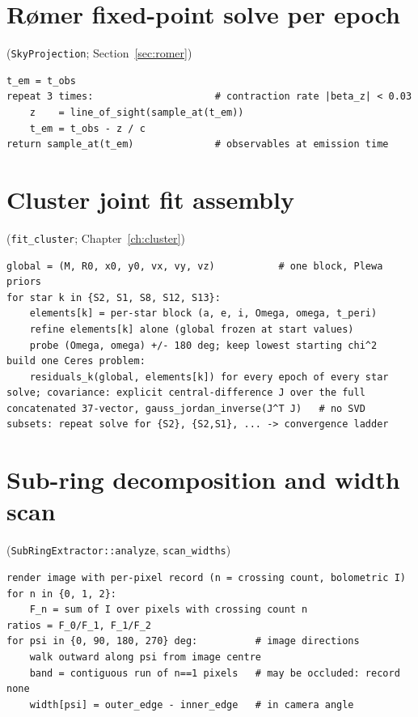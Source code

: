 \section{R{\o}mer fixed-point solve per epoch}
(\texttt{SkyProjection}; Section~\ref{sec:romer})

\begin{verbatim}
t_em = t_obs
repeat 3 times:                     # contraction rate |beta_z| < 0.03
    z    = line_of_sight(sample_at(t_em))
    t_em = t_obs - z / c
return sample_at(t_em)              # observables at emission time
\end{verbatim}

\section{Cluster joint fit assembly}
(\texttt{fit\_cluster}; Chapter~\ref{ch:cluster})

\begin{verbatim}
global = (M, R0, x0, y0, vx, vy, vz)           # one block, Plewa priors
for star k in {S2, S1, S8, S12, S13}:
    elements[k] = per-star block (a, e, i, Omega, omega, t_peri)
    refine elements[k] alone (global frozen at start values)
    probe (Omega, omega) +/- 180 deg; keep lowest starting chi^2
build one Ceres problem:
    residuals_k(global, elements[k]) for every epoch of every star
solve; covariance: explicit central-difference J over the full
concatenated 37-vector, gauss_jordan_inverse(J^T J)   # no SVD
subsets: repeat solve for {S2}, {S2,S1}, ... -> convergence ladder
\end{verbatim}

\section{Sub-ring decomposition and width scan}
(\texttt{SubRingExtractor::analyze}, \texttt{scan\_widths})

\begin{verbatim}
render image with per-pixel record (n = crossing count, bolometric I)
for n in {0, 1, 2}:
    F_n = sum of I over pixels with crossing count n
ratios = F_0/F_1, F_1/F_2
for psi in {0, 90, 180, 270} deg:          # image directions
    walk outward along psi from image centre
    band = contiguous run of n==1 pixels   # may be occluded: record none
    width[psi] = outer_edge - inner_edge   # in camera angle
\end{verbatim}
